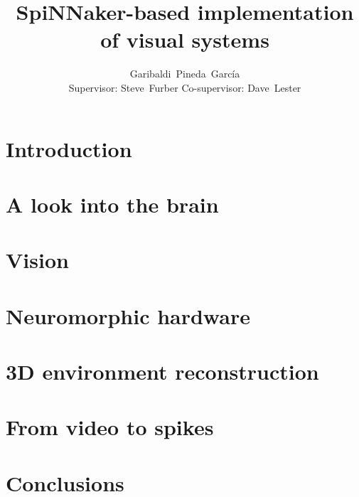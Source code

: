 \documentclass[a4paper]{memoir}
\title{SpiNNaker-based implementation of visual systems}
\author{Garibaldi~Pineda~García \\ Supervisor: Steve~Furber Co-supervisor: Dave~Lester}
\date{}
\begin{document}
  \thispagestyle{empty}
  



  \cleardoublepage
  \tableofcontents
  \cleardoublepage


  \chapter{Introduction}
  
  \label{chp:intro}

  \chapter{A look into the brain}
  \label{chp:brain}
  

  \chapter{Vision}
  \label{chp:vision}
  

  \chapter{Neuromorphic hardware}
  \label{chp:neuro-hw}
  

  \chapter{3D environment reconstruction}
  \label{chp:reconstruction}
  


  \chapter{From video to spikes}
  \label{chp:img2spk}
  

  \chapter{Conclusions}
  \label{chp:conclusions}
  

  \printbibliography
\end{document}
